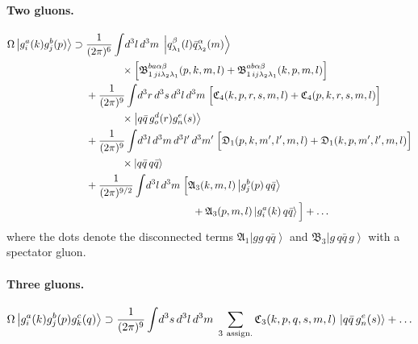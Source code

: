 \documentclass[11pt,a4paper]{article}
\numberwithin{equation}{section}
\newcommand{\mf}[1]{\mathfrak{#1}}
\newcommand{\ket}[1]{\left|#1\right\rangle}
\newcommand{\OM}{\Omega}
\newcommand{\qk}[3]{q^{#1}_{#2}(#3)}
\newcommand{\aqk}[3]{\bar q^{#1}_{#2}(#3)}
\newcommand{\gl}[3]{g^{#1}_{#2}(#3)}
\begin{document}
\paragraph{Two gluons.}
\begin{align}
\OM\ket{\gl{a}{i}{k}\gl{b}{j}{p}}\supset\;&\frac{1}{(2\pi)^{6}}\int\!d^{3}l\,d^{3}m\;
\ket{\qk{\beta}{\lambda_{1}}{l}\aqk{\alpha}{\lambda_{2}}{m}}
\nonumber\\&\hspace{1.2cm}\times\Big[\mf B^{ba\alpha\beta}_{1\,ji\lambda_{2}\lambda_{1}}(p,k,m,l)+\mf B^{ab\alpha\beta}_{1\,ij\lambda_{2}\lambda_{1}}(k,p,m,l)\Big]
\nonumber\\
&+\frac{1}{(2\pi)^{9}}\int\!d^{3}r\,d^{3}s\,d^{3}l\,d^{3}m\;
\Big[\mf C_{4}(k,p,r,s,m,l)+\mf C_{4}(p,k,r,s,m,l)\Big]
\nonumber\\&\hspace{1.2cm}\times\ket{q\bar q\,\gl{d}{o}{r}\gl{e}{n}{s}}
\nonumber\\
&+\frac{1}{(2\pi)^{9}}\int\!d^{3}l\,d^{3}m\,d^{3}l'\,d^{3}m'\;
\Big[\mf D_{1}(p,k,m',l',m,l)+\mf D_{1}(k,p,m',l',m,l)\Big]
\nonumber\\&\hspace{1.2cm}\times\ket{q\bar q\,q\bar q}
\nonumber\\
&+\frac{1}{(2\pi)^{9/2}}\int\!d^{3}l\,d^{3}m\;\Big[\mf A_{3}(k,m,l)\ket{\gl{b}{j}{p}\,q\bar q}
\nonumber\\&\hspace{3.6cm}
+\mf A_{3}(p,m,l)\ket{\gl{a}{i}{k}\,q\bar q}\Big]+\dots
\label{eq:Omgg}
\end{align}
where the dots denote the disconnected terms $\mf A_{1}\ket{gg\,q\bar q}$ and
$\mf B_{3}\ket{g\,q\bar q\,g}$ with a spectator gluon.

\paragraph{Three gluons.}
\begin{equation}
\OM\ket{\gl{a}{i}{k}\gl{b}{j}{p}\gl{c}{k}{q}}\supset\frac{1}{(2\pi)^{9}}\int\!d^{3}s\,d^{3}l\,d^{3}m\;
\sum_{3\ \rm assign.}\mf C_{3}(k,p,q,s,m,l)\,\ket{q\bar q\,\gl{e}{n}{s}}+\dots
\label{eq:Omggg}
\end{equation}
\end{document}
